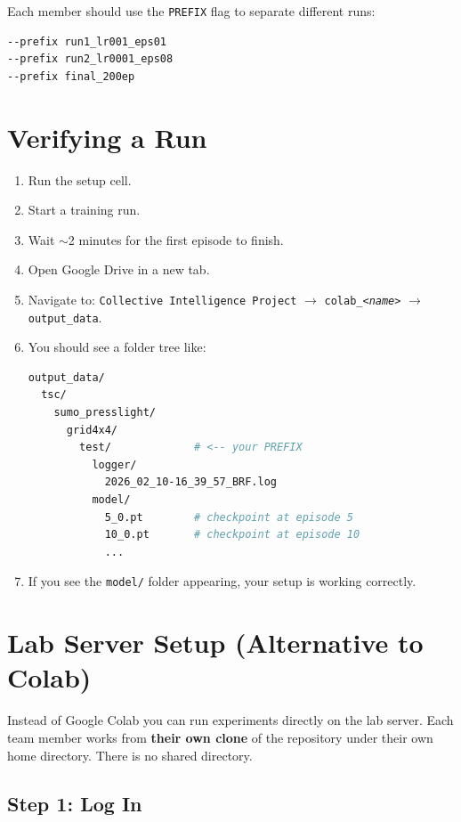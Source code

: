 \documentclass[11pt,a4paper]{article}
\begin{document}
Each member should use the \texttt{PREFIX} flag to separate different runs:
\begin{lstlisting}[language=bash]
--prefix run1_lr001_eps01
--prefix run2_lr0001_eps08
--prefix final_200ep
\end{lstlisting}

\section{Verifying a Run}

\begin{enumerate}
    \item Run the setup cell.
    \item Start a training run.
    \item Wait $\sim$2 minutes for the first episode to finish.
    \item Open Google Drive in a new tab.
    \item Navigate to: \texttt{Collective Intelligence Project} $\to$ \texttt{colab\_\textit{<name>}} $\to$ \texttt{output\_data}.
    \item You should see a folder tree like:
\begin{lstlisting}[language=bash]
output_data/
  tsc/
    sumo_presslight/
      grid4x4/
        test/             # <-- your PREFIX
          logger/
            2026_02_10-16_39_57_BRF.log
          model/
            5_0.pt        # checkpoint at episode 5
            10_0.pt       # checkpoint at episode 10
            ...
\end{lstlisting}
    \item If you see the \texttt{model/} folder appearing, your setup is working correctly.
\end{enumerate}

\section{Lab Server Setup (Alternative to Colab)}
\label{sec:server}

Instead of Google Colab you can run experiments directly on the lab server.
Each team member works from \textbf{their own clone} of the repository under their own home directory.
There is no shared directory.

\subsection{Step 1: Log In}
\end{document}
